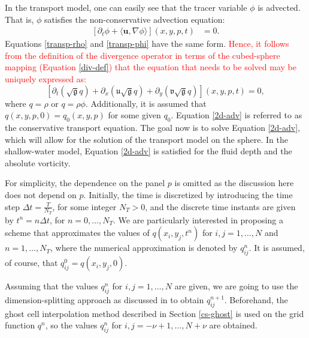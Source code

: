 \documentclass[preprint,12pt]{elsarticle}
\begin{document}
\begin{linenumbers}
In the transport model, one can easily see that the tracer variable $\phi$ is advected.
That is, $\phi$ satisfies the non-conservative advection equation:
\begin{align}
	\label{adv-phi}
	[\partial_t \phi +  
	\langle\boldsymbol{u}, \nabla \phi \rangle](x,y,p,t)&=0.
\end{align}
Equations \eqref{transp-rho} and \eqref{transp-phi} have the same form. 
\textcolor{red}{Hence, it follows from the definition of the divergence operator in terms of the cubed-sphere mapping (Equation \eqref{div-def}) that the equation that needs to be solved may be uniquely expressed as:}
\begin{equation}
	\label{2d-adv}
	[{\partial_t (\sqrt{\mathfrak{g}}q)}+
	{\partial_x (\mathfrak{u}\sqrt{\mathfrak{g}}q)}+
	{\partial_y (\mathfrak{v}\sqrt{\mathfrak{g}}q)}]
	(x, y, p, t) = 0,
\end{equation}
where $q=\rho$ or $q=\rho \phi$. 
Additionally, it is assumed that $q(x,y,p,0)=q_0(x,y,p)$ for some given $q_0$.
Equation \eqref{2d-adv} is referred to as the conservative transport equation.
The goal now is to solve Equation \eqref{2d-adv}, which will allow for the solution of the transport model on the sphere.
In the shallow-water model, Equation \eqref{2d-adv} is satisfied for the fluid depth and the absolute vorticity.

For simplicity, the dependence on the panel $p$ is omitted as the discussion here does not depend on $p$.
Initially, the time is discretized by introducing the time step $\Delta t = \frac{T}{N_T}$, for some integer $N_T > 0$, and  the discrete time instants are given by $t^n = n\Delta t$,
for $n=0,\ldots,N_T$. 
We are particularly interested in proposing a scheme that approximates the values of $q(x_i,y_j,t^n)$ for $i,j=1,\ldots,N$ and $n=1,\ldots,N_T$, where the numerical approximation is denoted  by $q_{ij}^n$.
It is assumed, of course, that $q_{ij}^0 = q(x_i,y_j,0)$.

Assuming that the values $q_{ij}^n$ for $i,j=1, \ldots, N$ are given, we are going to use the dimension-splitting approach as discussed in \cite{lin:1996} to obtain $q_{ij}^{n+1}$. 
Beforehand, the ghost cell interpolation method described in Section \ref{cs-ghost} is used on the grid function $q^n$, so  the values $q_{ij}^n$ for $i,j=-\nu+1, \ldots, N+\nu$ are obtained.


\end{linenumbers}
\end{document}
